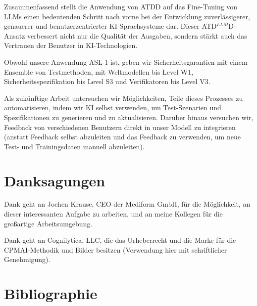 \documentclass[twocolumn]{article}
\newcommand{\ATDLLMD}{ATD$^{LLM}$D}%
\begin{document}
Zusammenfassend stellt die Anwendung von ATDD auf das Fine-Tuning von LLMs einen bedeutenden Schritt nach vorne bei der Entwicklung zuverlässigerer, genauerer und benutzerzentrierter KI-Sprachsysteme dar. Dieser \ATDLLMD{}-Ansatz verbessert nicht nur die Qualität der Ausgaben, sondern stärkt auch das Vertrauen der Benutzer in KI-Technologien.

Obwohl unsere Anwendung ASL-1 ist, geben wir Sicherheitsgarantien mit einem Ensemble von Testmethoden, mit Weltmodellen bis Level W1, Sicherheitsspezifikation bis Level S3 und Verifikatoren bis Level V3.

Als zukünftige Arbeit untersuchen wir Möglichkeiten, Teile dieses Prozesses zu automatisieren, indem wir KI selbst verwenden, um Test-Szenarien und Spezifikationen zu generieren und zu aktualisieren. Darüber hinaus versuchen wir, Feedback von verschiedenen Benutzern direkt in unser Modell zu integrieren (anstatt Feedback selbst abzuleiten und das Feedback zu verwenden, um neue Test- und Trainingsdaten manuell abzuleiten).

\section{Danksagungen}

Dank geht an Jochen Krause, CEO der Mediform GmbH, für die Möglichkeit, an dieser interessanten Aufgabe zu arbeiten, und an meine Kollegen für die großartige Arbeitsumgebung.

Dank geht an Cognilytica, LLC, die das Urheberrecht und die Marke für die CPMAI-Methodik und Bilder besitzen (Verwendung hier mit schriftlicher Genehmigung).

\section{Bibliographie}
\end{document}
